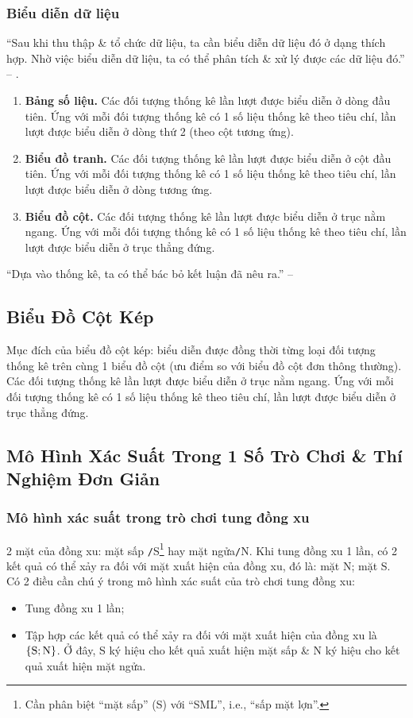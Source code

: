 \documentclass{article}
\numberwithin{equation}{section}
\begin{document}
\subsubsection{Biểu diễn dữ liệu}
``Sau khi thu thập \& tổ chức dữ liệu, ta cần biểu diễn dữ liệu đó ở dạng thích hợp. Nhờ việc biểu diễn dữ liệu, ta có thể phân tích \& xử lý được các dữ liệu đó.'' -- \cite[p. 6]{Thai_Anh_Dat_Ha_Loan_Nam_Quang_Toan_6_tap_2}.
\begin{enumerate}
	\item \textbf{Bảng số liệu.} Các đối tượng thống kê lần lượt được biểu diễn ở dòng đầu tiên. Ứng với mỗi đối tượng thống kê có 1 số liệu thống kê theo tiêu chí, lần lượt được biểu diễn ở dòng thứ 2 (theo cột tương ứng).
	\item \textbf{Biểu đồ tranh.} Các đối tượng thống kê lần lượt được biểu diễn ở cột đầu tiên. Ứng với mỗi đối tượng thống kê có 1 số liệu thống kê theo tiêu chí, lần lượt được biểu diễn ở dòng tương ứng.
	\item \textbf{Biểu đồ cột.} Các đối tượng thống kê lần lượt được biểu diễn ở trục nằm ngang. Ứng với mỗi đối tượng thống kê có 1 số liệu thống kê theo tiêu chí, lần lượt được biểu diễn ở trục thẳng đứng.
\end{enumerate}
``Dựa vào thống kê, ta có thể bác bỏ kết luận đã nêu ra.'' -- \cite[p. 8]{Thai_Anh_Dat_Ha_Loan_Nam_Quang_Toan_6_tap_2}

\subsection{Biểu Đồ Cột Kép}
Mục đích của biểu đồ cột kép: biểu diễn được đồng thời từng loại đối tượng thống kê trên cùng 1 biểu đồ cột (ưu điểm so với biểu đồ cột đơn thông thường). Các đối tượng thống kê lần lượt được biểu diễn ở trục nằm ngang. Ứng với mỗi đối tượng thống kê có 1 số liệu thống kê theo tiêu chí, lần lượt được biểu diễn ở trục thẳng đứng.

\subsection{Mô Hình Xác Suất Trong 1 Số Trò Chơi \& Thí Nghiệm Đơn Giản}

\subsubsection{Mô hình xác suất trong trò chơi tung đồng xu}
2 mặt của đồng xu: mặt sấp \texttt{/}S\footnote{Cần phân biệt ``mặt sấp'' (S) với ``SML'', i.e., ``sấp mặt lợn''.} hay mặt ngửa\texttt{/}N. Khi tung đồng xu 1 lần, có 2 kết quả có thể xảy ra đối với mặt xuất hiện của đồng xu, đó là: mặt N; mặt S. Có 2 điều cần chú ý trong mô hình xác suất của trò chơi tung đồng xu:
\begin{itemize}
	\item Tung đồng xu 1 lần;
	\item Tập hợp các kết quả có thể xảy ra đối với mặt xuất hiện của đồng xu là $\{\rm S;N\}$. Ở đây, S ký hiệu cho kết quả xuất hiện mặt sấp \& N ký hiệu cho kết quả xuất hiện mặt ngửa.
\end{itemize}
\end{document}
